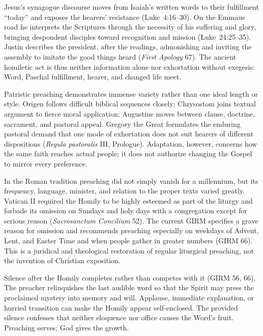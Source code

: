 Jesus's synagogue discourse moves from Isaiah's written words to their fulfillment ``today'' and exposes the hearers' resistance (Luke~4:16--30). On the Emmaus road he interprets the Scriptures through the necessity of his suffering and glory, bringing despondent disciples toward recognition and mission (Luke~24:25--35). Justin describes the president, after the readings, admonishing and inviting the assembly to imitate the good things heard (\emph{First Apology} 67). The ancient homiletic act is thus neither information alone nor exhortation without exegesis: Word, Paschal fulfillment, hearer, and changed life meet.

Patristic preaching demonstrates immense variety rather than one ideal length or style. Origen follows difficult biblical sequences closely; Chrysostom joins textual argument to fierce moral application; Augustine moves between clause, doctrine, sacrament, and pastoral appeal. Gregory the Great formulates the enduring pastoral demand that one mode of exhortation does not suit hearers of different dispositions (\emph{Regula pastoralis} III, Prologue). Adaptation, however, concerns how the same faith reaches actual people; it does not authorize changing the Gospel to mirror every preference.

In the Roman tradition preaching did not simply vanish for a millennium, but its frequency, language, minister, and relation to the proper texts varied greatly. Vatican II required the Homily to be highly esteemed as part of the liturgy and forbade its omission on Sundays and holy days with a congregation except for serious reason (\emph{Sacrosanctum Concilium} 52). The current GIRM specifies a grave reason for omission and recommends preaching especially on weekdays of Advent, Lent, and Easter Time and when people gather in greater numbers (GIRM 66). This is a juridical and theological restoration of regular liturgical preaching, not the invention of Christian exposition.

Silence after the Homily completes rather than competes with it (GIRM 56, 66). The preacher relinquishes the last audible word so that the Spirit may press the proclaimed mystery into memory and will. Applause, immediate explanation, or hurried transition can make the Homily appear self-enclosed. The provided silence confesses that neither eloquence nor office causes the Word's fruit. Preaching serves; God gives the growth.


